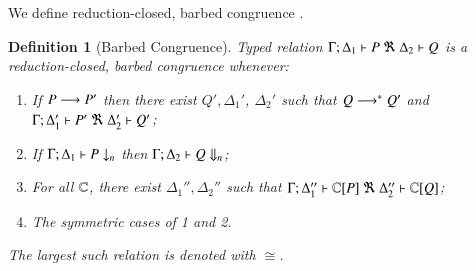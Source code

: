 \documentclass[preprint,11pt]{elsarticle}
\newtheorem{definition}{Definition}[section]
\begin{document}
{%

We define reduction-closed, barbed congruence \cite{HondaKYoshida95}. 


\begin{definition}[Barbed Congruence]
\label{def:rc}
	Typed relation
	$\horel{\Gamma}{\Delta_1}{P}{\ \Re\ }{\Delta_2}{Q}$
	is a {\em reduction-closed, barbed congruence} whenever:
	\begin{enumerate}[1.]
		\item	If $P \longrightarrow P'$ then there exist $Q', \Delta_1'$,  $\Delta_2'$ such that $Q \longrightarrow^* Q'$ and
			$\horel{\Gamma}{\Delta_1'}{P'}{\ \Re\ }{\Delta_2'}{Q'}$; 

			\item	If $\Gamma;\Delta_1 \vdash P \downarrow_{n}$ then $\Gamma;\Delta_2 \vdash Q \Downarrow_{n}$; %


		\item	For all ${\mathbb{C}}$, there exist $\Delta_1'',\Delta_2''$ such that  $\horel{\Gamma}{\Delta_1''}{\context{\C}{P}}{\ \Re\ }{\Delta_2''}{\context{\C}{Q}}$;
		                      \item	The symmetric cases of 1 and 2.                
	\end{enumerate}
	The largest such relation is denoted with $\cong$.
\end{definition}

{
}}
\end{document}
